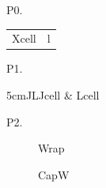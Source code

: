 \documentclass{article}
\begin{document}
\everypar{[E]}
P0.\begin{tabularx}{5cm}{Xl}Xcell & l\end{tabularx}

P1.\begin{tabulary}{5cm}{JL}Jcell & Lcell\end{tabulary}

P2.\begin{figure}Wrap\caption{CapW}\end{figure}
\everypar{}
\end{document}
